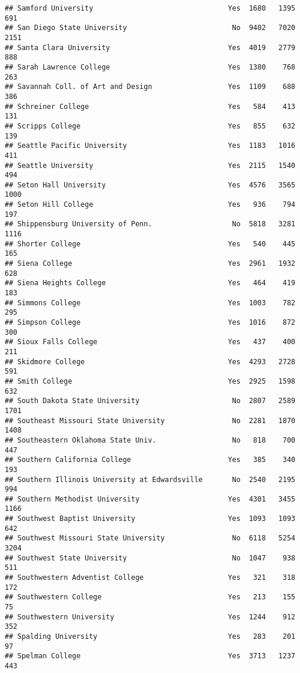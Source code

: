 \documentclass[
]{article}
\begin{document}
\begin{verbatim}
## Samford University                                Yes  1680   1395    691
## San Diego State University                         No  9402   7020   2151
## Santa Clara University                            Yes  4019   2779    888
## Sarah Lawrence College                            Yes  1380    768    263
## Savannah Coll. of Art and Design                  Yes  1109    688    386
## Schreiner College                                 Yes   584    413    131
## Scripps College                                   Yes   855    632    139
## Seattle Pacific University                        Yes  1183   1016    411
## Seattle University                                Yes  2115   1540    494
## Seton Hall University                             Yes  4576   3565   1000
## Seton Hill College                                Yes   936    794    197
## Shippensburg University of Penn.                   No  5818   3281   1116
## Shorter College                                   Yes   540    445    165
## Siena College                                     Yes  2961   1932    628
## Siena Heights College                             Yes   464    419    183
## Simmons College                                   Yes  1003    782    295
## Simpson College                                   Yes  1016    872    300
## Sioux Falls College                               Yes   437    400    211
## Skidmore College                                  Yes  4293   2728    591
## Smith College                                     Yes  2925   1598    632
## South Dakota State University                      No  2807   2589   1701
## Southeast Missouri State University                No  2281   1870   1408
## Southeastern Oklahoma State Univ.                  No   818    700    447
## Southern California College                       Yes   385    340    193
## Southern Illinois University at Edwardsville       No  2540   2195    994
## Southern Methodist University                     Yes  4301   3455   1166
## Southwest Baptist University                      Yes  1093   1093    642
## Southwest Missouri State University                No  6118   5254   3204
## Southwest State University                         No  1047    938    511
## Southwestern Adventist College                    Yes   321    318    172
## Southwestern College                              Yes   213    155     75
## Southwestern University                           Yes  1244    912    352
## Spalding University                               Yes   283    201     97
## Spelman College                                   Yes  3713   1237    443

\end{verbatim}
\end{document}
